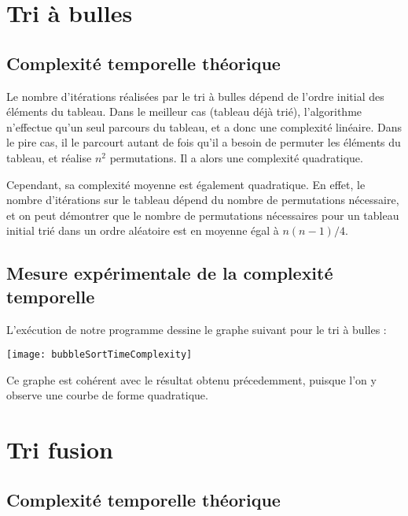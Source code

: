   \section{Tri à bulles}

    \subsection{Complexité temporelle théorique}

      Le nombre d'itérations réalisées par le tri à bulles dépend de l'ordre initial des éléments du tableau.
      Dans le meilleur cas (tableau déjà trié), l'algorithme n'effectue qu'un seul parcours du tableau, et a
      donc une complexité linéaire. Dans le pire cas, il le parcourt autant de fois qu'il a besoin de permuter les éléments
      du tableau, et réalise $n^2$ permutations. Il a alors une complexité quadratique.

      Cependant, sa complexité moyenne est également quadratique. En effet, le nombre d'itérations sur le tableau
      dépend du nombre de permutations nécessaire, et on peut démontrer que le nombre de permutations nécessaires pour
      un tableau initial trié dans un ordre aléatoire est en moyenne égal à $n(n-1)/4$.

    \subsection{Mesure expérimentale de la complexité temporelle}

      L'exécution de notre programme dessine le graphe suivant pour le tri à bulles :
      \begin{center}
        \texttt{[image: bubbleSortTimeComplexity]}
      \end{center}

      Ce graphe est cohérent avec le résultat obtenu précedemment, puisque l'on y observe
      une courbe de forme quadratique.

  \section{Tri fusion}
    \subsection{Complexité temporelle théorique}

